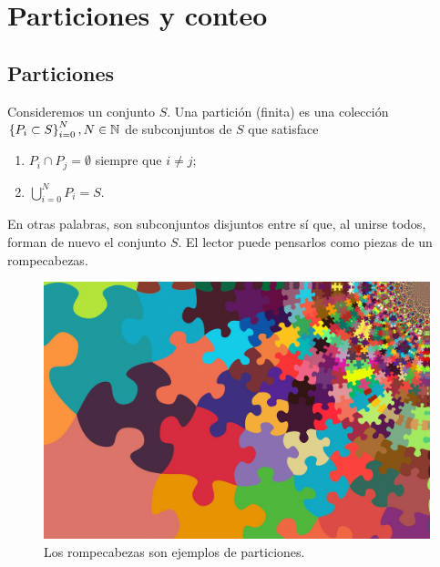 \section{Particiones y conteo}



%


\subsection{Particiones}

Consideremos un conjunto $ S $. Una partición (finita) es una colección $ \left\{ P_i \subset S \right\}_{i=0}^{N}, N \in \mathbb{N} $ de subconjuntos de $ S $ que satisface
\begin{enumerate}
	\item $ P_i \cap P_j =\emptyset $ siempre que $ i\neq j $;
	\item $ \bigcup_{i=0}^{N} P_i = S $. 
\end{enumerate}

En otras palabras, son subconjuntos disjuntos entre sí que, al unirse todos, forman de nuevo el conjunto $ S $. El lector puede pensarlos como piezas de un rompecabezas.

\begin{figure}
	\centering
	\includegraphics[width=0.7\linewidth]{./em/puzzle-5294291_1280}
	\caption[Rompecabezas]{Los rompecabezas son ejemplos de particiones.}
	\label{fig:puzzle-52942911280}
\end{figure}

